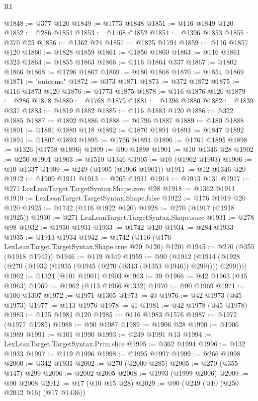 \begin{lexlean}{R1}
\begin{coremodule}
@1848 := @377 @120
@1849 := @1773 @1848
@1851 := @116 @1849 @120
@1852 := @286 @1851
@1853 := @1768 @1852
@1854 := @1396 @1853
@1855 := @370 @25
@1856 := @1362 @24
@1857 := @1825 @1791
@1859 := @116 @1857 @120
@1860 := @1828 @1859
@1861 := @1856 @1860
@1863 := @116 @1861 @323
@1864 := @1855 @1863
@1866 := @116 @1864 @337
@1867 := @1802 @1866
@1868 := @1796 @1867
@1869 := @180 @1868
@1870 := @1854 @1869
@1871 := "outcome"
@1872 := @373 @1871
@1873 := @372 @1872
@1875 := @116 @1873 @120
@1876 := @1773 @1875
@1878 := @116 @1876 @120
@1879 := @286 @1878
@1880 := @1768 @1879
@1881 := @1396 @1880
@1882 := @1839 @337
@1883 := @1819 @1882
@1885 := @116 @1883 @120
@1886 := @322 @1885
@1887 := @1802 @1886
@1888 := @1796 @1887
@1889 := @180 @1888
@1891 := @1881 @1889 @118
@1892 := @1870 @1891
@1893 := @1847 @1892
@1894 := @1807 @1893
@1895 := @1766 @1894
@1896 := @1761 @1895
@1898 := @1326 (@1758 @1896)
@1899 := @90 @1898
@1901 := @10 @1346 @28
@1902 := @250 @1901
@1903 := @1510 @1346
@1905 := @10 (@1902 @1903)
@1906 := @10 @1337
@1909 := @249 (@1905 (@1906 @1901))
@1911 := @12 @1346 @20
@1912 := @1909 @1911
@1913 := @265 @1911
@1914 := @1913 @131
@1917 := @271 LexLeanTarget.TargetSyntax.Shape.zero @98
@1918 := @1362 @1911
@1919 := LexLeanTarget.TargetSyntax.Shape.false
@1922 := @176 @1919 @20 @120
@1925 := @1742 (@116 @1922 @120)
@1928 := @270 (@1917 (@1918 @1925))
@1930 := @271 LexLeanTarget.TargetSyntax.Shape.succ
@1931 := @278 @98
@1932 := @1930 @1931
@1933 := @1742 @120
@1934 := @284 @1933
@1935 := @1913 @1934
@1942 := @1742 (@116 (@176 LexLeanTarget.TargetSyntax.Shape.true @20 @120) @120)
@1945 := @270 (@355 (@1918 @1942))
@1946 := @119 @349
@1959 := @90
    (@1912 (@1914 (@1928 (@270 (@1932 (@1935 (@1945 (@270 (@343 (@1353 @1946)) @299)))) @299))))
@1962 := @1324 (@101 @1901) @1903
@1963 := 39
@1966 := @42 @1963 (@45 @1963)
@1969 := @1962 (@113 @1966 @1332)
@1970 := @90 @1969
@1971 := @100 @1307
@1972 := @1971 @1305
@1973 := 40
@1976 := @42 @1973 (@45 @1973)
@1977 := @113 @1976
@1978 := 41
@1981 := @42 @1978 (@45 @1978)
@1983 := @125 @1981 @120
@1985 := @116 @1983 @1576
@1987 := @1972 (@1977 @1985)
@1988 := @90 @1987
@1989 := @1906 @28
@1990 := @1906 @1989
@1991 := @101 @1990
@1993 := @249 @1991 @13
@1994 := LexLeanTarget.TargetSyntax.Prim.slice
@1995 := @362 @1994
@1996 := @132 @1933
@1997 := @119 @1996
@1998 := @1995 @1997
@1999 := @266 @1998
@2000 := @342 @1931
@2002 := @270 (@2000 @285)
@2005 := @270 (@355 @147) @299
@2006 := @2002 @2005
@2008 := @1993 (@1999 @2006)
@2009 := @90 @2008
@2012 := @17 (@10 @15 @28)
@2029 := @90
    (@249
      (@10 (@250 @2012 @16) (@17 @1436))

\end{coremodule}
\end{lexlean}
